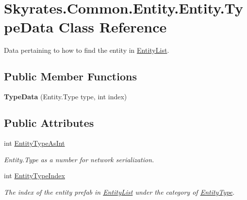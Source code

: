 \hypertarget{class_skyrates_1_1_common_1_1_entity_1_1_entity_1_1_type_data}{\section{Skyrates.\-Common.\-Entity.\-Entity.\-Type\-Data Class Reference}
\label{class_skyrates_1_1_common_1_1_entity_1_1_entity_1_1_type_data}
}


Data pertaining to how to find the entity in \hyperlink{class_skyrates_1_1_common_1_1_entity_1_1_entity_list}{Entity\-List}.  


\subsection*{Public Member Functions}
\begin{DoxyCompactItemize}
\item 
\hypertarget{class_skyrates_1_1_common_1_1_entity_1_1_entity_1_1_type_data_a4ef8546f0aeaa4f064e3dd470c202832}{{\bfseries Type\-Data} (Entity.\-Type type, int index)}\label{class_skyrates_1_1_common_1_1_entity_1_1_entity_1_1_type_data_a4ef8546f0aeaa4f064e3dd470c202832}

\end{DoxyCompactItemize}
\subsection*{Public Attributes}
\begin{DoxyCompactItemize}
\item 
int \hyperlink{class_skyrates_1_1_common_1_1_entity_1_1_entity_1_1_type_data_ae1d503ba32f705ea1c76887377b9ca41}{Entity\-Type\-As\-Int}
\begin{DoxyCompactList}\small\item\em Entity.\-Type as a number for network serialization. \end{DoxyCompactList}\item 
int \hyperlink{class_skyrates_1_1_common_1_1_entity_1_1_entity_1_1_type_data_a11701833c616d61f48c61a0a6d5925a7}{Entity\-Type\-Index}
\begin{DoxyCompactList}\small\item\em The index of the entity prefab in \hyperlink{class_skyrates_1_1_common_1_1_entity_1_1_entity_list}{Entity\-List} under the category of \hyperlink{class_skyrates_1_1_common_1_1_entity_1_1_entity_1_1_type_data_a77a694c041e70f02ca1bcc12b9244de5}{Entity\-Type}. \end{DoxyCompactList}\end{DoxyCompactItemize}
